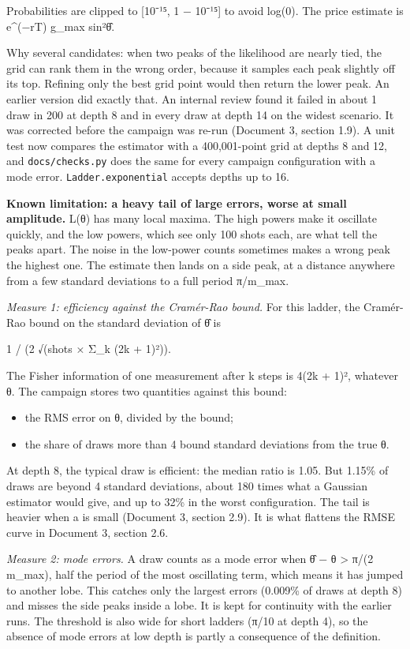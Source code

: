 \documentclass[
  10pt,
]{article}
\providecommand{\tightlist}{%
  \setlength{\itemsep}{0pt}\setlength{\parskip}{0pt}}
\begin{document}
Probabilities are clipped to {[}10⁻¹⁵, 1 − 10⁻¹⁵{]} to avoid log(0). The
price estimate is e\^{}(−rT) g\_max sin²θ̂.

Why several candidates: when two peaks of the likelihood are nearly
tied, the grid can rank them in the wrong order, because it samples each
peak slightly off its top. Refining only the best grid point would then
return the lower peak. An earlier version did exactly that. An internal
review found it failed in about 1 draw in 200 at depth 8 and in every
draw at depth 14 on the widest scenario. It was corrected before the
campaign was re-run (Document 3, section 1.9). A unit test now compares
the estimator with a 400,001-point grid at depths 8 and 12, and
\texttt{docs/checks.py} does the same for every campaign configuration
with a mode error. \texttt{Ladder.exponential} accepts depths up to 16.

\textbf{Known limitation: a heavy tail of large errors, worse at small
amplitude.} L(θ) has many local maxima. The high powers make it
oscillate quickly, and the low powers, which see only 100 shots each,
are what tell the peaks apart. The noise in the low-power counts
sometimes makes a wrong peak the highest one. The estimate then lands on
a side peak, at a distance anywhere from a few standard deviations to a
full period π/m\_max.

\emph{Measure 1: efficiency against the Cramér-Rao bound.} For this
ladder, the Cramér-Rao bound on the standard deviation of θ̂ is

1 / (2 √(shots × Σ\_k (2k + 1)²)).

The Fisher information of one measurement after k steps is 4(2k + 1)²,
whatever θ. The campaign stores two quantities against this bound:

\begin{itemize}
\tightlist
\item
  the RMS error on θ, divided by the bound;
\item
  the share of draws more than 4 bound standard deviations from the true
  θ.
\end{itemize}

At depth 8, the typical draw is efficient: the median ratio is 1.05. But
1.15\% of draws are beyond 4 standard deviations, about 180 times what a
Gaussian estimator would give, and up to 32\% in the worst
configuration. The tail is heavier when a is small (Document 3, section
2.9). It is what flattens the RMSE curve in Document 3, section 2.6.

\emph{Measure 2: mode errors.} A draw counts as a mode error when
\textbar θ̂ − θ\textbar{} \textgreater{} π/(2 m\_max), half the period of
the most oscillating term, which means it has jumped to another lobe.
This catches only the largest errors (0.009\% of draws at depth 8) and
misses the side peaks inside a lobe. It is kept for continuity with the
earlier runs. The threshold is also wide for short ladders (π/10 at
depth 4), so the absence of mode errors at low depth is partly a
consequence of the definition.
\end{document}

